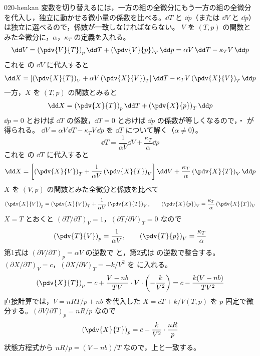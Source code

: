 \documentclass[uplatex,dvipdfmx,a4paper,11pt]{jsarticle}
\begin{document}
\begin{kaisetsu}{020-henkan}
\houshin 変数を切り替えるには，一方の組の全微分にもう一方の組の全微分を代入し，独立に動かせる微小量の係数を比べる。$\dd T$ と $\dd p$（または $\dd V$ と $\dd p$）は独立に選べるので，係数が一致しなければならない。
\keisan {} $V$ を $(T,p)$ の関数とみた全微分に，$\alpha$，$\kappa_{T}$ の定義を入れる。
\[ \dd V = \left(\pdv{V}{T}\right)_{p}\dd T + \left(\pdv{V}{p}\right)_{T}\dd p = \alpha V\,\dd T - \kappa_{T}V\,\dd p \]
これを  の $\dd V$ に代入すると
\[ \dd X = \left[\left(\pdv{X}{T}\right)_{V} + \alpha V\left(\pdv{X}{V}\right)_{T}\right]\dd T - \kappa_{T}V\left(\pdv{X}{V}\right)_{T}\dd p \]
一方，$X$ を $(T,p)$ の関数とみると
\[ \dd X = \left(\pdv{X}{T}\right)_{p}\dd T + \left(\pdv{X}{p}\right)_{T}\dd p \]
$\dd p = 0$ とおけば $\dd T$ の係数，$\dd T = 0$ とおけば $\dd p$ の係数が等しくなるので，・ が得られる。
 $\dd V = \alpha V\,\dd T - \kappa_{T}V\,\dd p$ を $\dd T$ について解く（$\alpha \neq 0$）。
\[ \dd T = \frac{1}{\alpha V}\dd V + \frac{\kappa_{T}}{\alpha}\dd p \]
これを  の $\dd T$ に代入すると
\[ \dd X = \left[\left(\pdv{X}{V}\right)_{T} + \frac{1}{\alpha V}\left(\pdv{X}{T}\right)_{V}\right]\dd V + \frac{\kappa_{T}}{\alpha}\left(\pdv{X}{T}\right)_{V}\dd p \]
$X$ を $(V,p)$ の関数とみた全微分と係数を比べて
\[ \left(\pdv{X}{V}\right)_{p} = \left(\pdv{X}{V}\right)_{T} + \frac{1}{\alpha V}\left(\pdv{X}{T}\right)_{V}, \qquad \left(\pdv{X}{p}\right)_{V} = \frac{\kappa_{T}}{\alpha}\left(\pdv{X}{T}\right)_{V} \]
$X = T$ とおくと $(\partial T/\partial T)_{V} = 1$，$(\partial T/\partial V)_{T} = 0$ なので
\[ \left(\pdv{T}{V}\right)_{p} = \frac{1}{\alpha V}, \qquad \left(\pdv{T}{p}\right)_{V} = \frac{\kappa_{T}}{\alpha} \]
第1式は $(\partial V/\partial T)_{p} = \alpha V$ の逆数で  と，第2式は  の逆数で整合する。
 $(\partial X/\partial T)_{V} = c$，$(\partial X/\partial V)_{T} = -k/V^{2}$ を  に入れる。
\[ \left(\pdv{X}{T}\right)_{p} = c + \frac{V - nb}{TV}\cdot V\cdot\left(-\frac{k}{V^{2}}\right) = c - \frac{k(V - nb)}{TV^{2}} \]
直接計算では，$V = nRT/p + nb$ を代入した $X = cT + k/V(T,p)$ を $p$ 固定で微分する。$(\partial V/\partial T)_{p} = nR/p$ なので
\[ \left(\pdv{X}{T}\right)_{p} = c - \frac{k}{V^{2}}\cdot\frac{nR}{p} \]
状態方程式から $nR/p = (V - nb)/T$ なので，上と一致する。

\end{kaisetsu}
\end{document}
